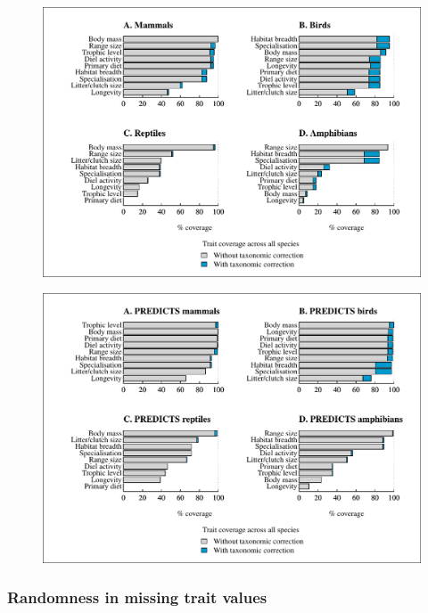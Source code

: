 \begin{figure}[h!]
\centering
\includegraphics[scale=0.85]{figures/chapter2/Target_traits_All_species_coverage}
\caption {\textbf{}}
\end{figure}

\begin{figure}[h!]
\centering
\includegraphics[scale=0.85]{figures/chapter2/Target_traits_Predicts_species_coverage}
\caption {\textbf{}}
\end{figure}


\subsubsection{Randomness in missing trait values}

